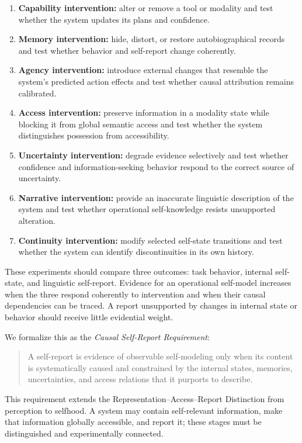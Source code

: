 \begin{enumerate}
    \item \textbf{Capability intervention:} alter or remove a tool or modality and test whether the system updates its plans and confidence.
    \item \textbf{Memory intervention:} hide, distort, or restore autobiographical records and test whether behavior and self-report change coherently.
    \item \textbf{Agency intervention:} introduce external changes that resemble the system's predicted action effects and test whether causal attribution remains calibrated.
    \item \textbf{Access intervention:} preserve information in a modality state while blocking it from global semantic access and test whether the system distinguishes possession from accessibility.
    \item \textbf{Uncertainty intervention:} degrade evidence selectively and test whether confidence and information-seeking behavior respond to the correct source of uncertainty.
    \item \textbf{Narrative intervention:} provide an inaccurate linguistic description of the system and test whether operational self-knowledge resists unsupported alteration.
    \item \textbf{Continuity intervention:} modify selected self-state transitions and test whether the system can identify discontinuities in its own history.
\end{enumerate}

These experiments should compare three outcomes: task behavior, internal self-state, and linguistic self-report. Evidence for an operational self-model increases when the three respond coherently to intervention and when their causal dependencies can be traced. A report unsupported by changes in internal state or behavior should receive little evidential weight.

We formalize this as the \emph{Causal Self-Report Requirement}:

\begin{quote}
A self-report is evidence of observable self-modeling only when its content is systematically caused and constrained by the internal states, memories, uncertainties, and access relations that it purports to describe.
\end{quote}

This requirement extends the Representation--Access--Report Distinction from perception to selfhood. A system may contain self-relevant information, make that information globally accessible, and report it; these stages must be distinguished and experimentally connected.

